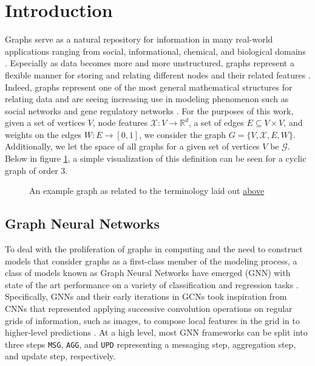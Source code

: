 \section{Introduction}
\label{sec:intro}
Graphs serve as a natural repository for information in many real-world applications ranging from social, informational, chemical, and biological domains \cite{cho_friendship_2011}. Especially as data becomes more and more unstructured, graphs represent a flexible manner for storing and relating different nodes and their related features \cite{washio_state_2003}. Indeed, graphs represent one of the most general mathematical structures for relating data and are seeing increasing use in modeling phenomenon such as social networks and gene regulatory networks \cite{washio_state_2003,petralia_new_2016}. For the purposes of this work, given a set of vertices $V$, node features $\mathcal{X} : V \rightarrow \mathbb{R}^{d}$, a set of edges $E \subseteq V \times V$, and weights on the edges $W : E \rightarrow [0,1]$, we consider the graph $G = \{V, \mathcal{X}, E, W\}$. Additionally, we let the space of all graphs for a given set of vertices $V$ be $\mathcal{G}$. Below in figure \ref{fig:graph_ex}, a simple visualization of this definition can be seen for a cyclic graph of order 3.
\begin{figure}[b]
  \centering
  
  \caption{An example graph as related to the terminology laid out \hyperref[sec:intro]{above}}
  \label{fig:graph_ex}
\end{figure}

\subsection{Graph Neural Networks}
To deal with the proliferation of graphs in computing and the need to construct models that consider graphs as a first-class member of the modeling process, a class of models known as Graph Neural Networks have emerged (GNN) with state of the art performance on a variety of classification and regression tasks \cite{ying_gnnexplainer_2019}. Specifically, GNNs and their early iterations in GCNs took inspiration from CNNs that represented applying successive convolution operations on regular grids of information, such as images, to compose local features in the grid in to higher-level predictions \cite{defferrard_convolutional_2017}. At a high level, most GNN frameworks can be split into three steps \verb|MSG|, \verb|AGG|, and \verb|UPD| representing a messaging step, aggregation step, and update step, respectively.

